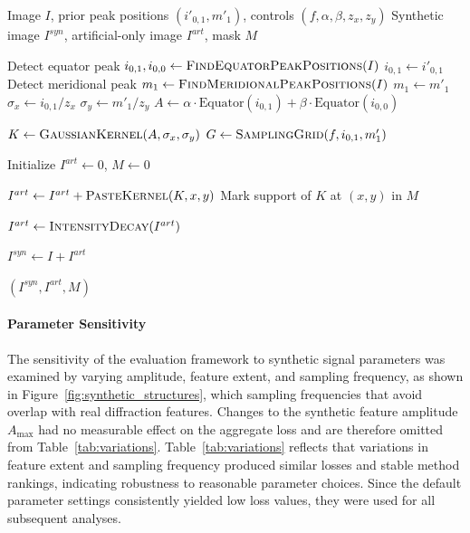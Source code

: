 \documentclass[iucr]{iucrjournals}
\begin{document}
\begin{algorithm}[htbp]
\centering
\begin{minipage}{0.96\columnwidth}
\small
\begin{algorithmic}[1]

\Require Image $I$, prior peak positions $(i'_{0,1}, m'_1)$, controls $(f, \alpha, \beta, z_x, z_y)$
\Ensure Synthetic image $I^{syn}$, artificial-only image $I^{art}$, mask $M$

\State Detect equator peak $i_{0,1}, i_{0,0} \leftarrow \textsc{FindEquatorPeakPositions}(I)$
    \State $i_{0,1} \leftarrow i'_{0,1}$
\EndIf
\State Detect meridional peak $m_1 \leftarrow \textsc{FindMeridionalPeakPositions}(I)$
    \State $m_1 \leftarrow m'_1$
\EndIf
\State $\sigma_x \leftarrow i_{0,1} / z_x$
\State $\sigma_y \leftarrow m'_1 / z_y$
\State $A \leftarrow \alpha \cdot \text{Equator}(i_{0,1}) + \beta \cdot \text{Equator}(i_{0,0})$

\State $K \leftarrow \textsc{GaussianKernel}(A, \sigma_x, \sigma_y)$
\State $G \leftarrow \textsc{SamplingGrid}(f, i_{0,1}, m'_1)$

\State Initialize $I^{art} \leftarrow 0$, $M \leftarrow 0$

    \State $I^{art} \leftarrow I^{art} + \textsc{PasteKernel}(K, x, y)$
    \State Mark support of $K$ at $(x,y)$ in $M$
\EndFor

\State $I^{art} \gets \textsc{IntensityDecay}(I^{art})$

\State $I^{syn} \leftarrow I + I^{art}$

\State \Return $(I^{syn}, I^{art}, M)$

\end{algorithmic}
\end{minipage}
\caption{Procedure for synthetic-feature generation and mask construction used for validation in the absence of ground-truth background.}
\label{alg:synthetic_signal}
\end{algorithm}


\paragraph{Parameter Sensitivity}
The sensitivity of the evaluation framework to synthetic signal parameters was examined by varying amplitude, feature extent, and sampling frequency, as shown in Figure~\ref{fig:synthetic_structures}, which sampling frequencies that avoid overlap with real diffraction features. Changes to the synthetic feature amplitude $A_{\mathrm{max}}$ had no measurable effect on the aggregate loss and are therefore omitted from Table~\ref{tab:variations}. Table~\ref{tab:variations} reflects that variations in feature extent and sampling frequency produced similar losses and stable method rankings, indicating robustness to reasonable parameter choices. Since the default parameter settings consistently yielded low loss values, they were used for all subsequent analyses.
\end{document}
